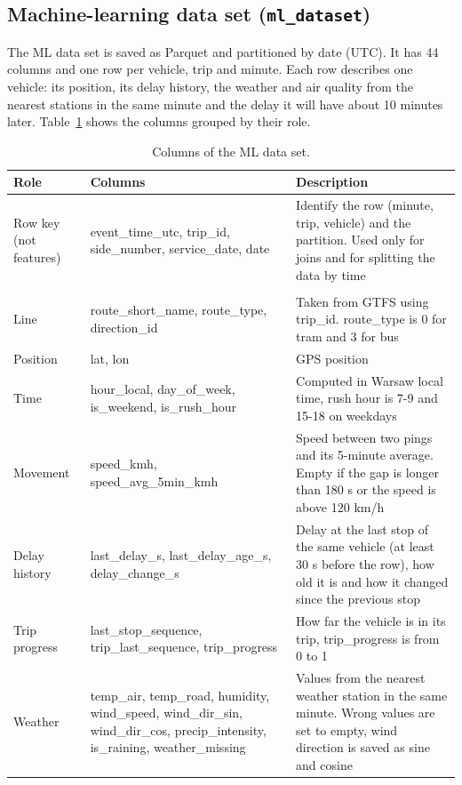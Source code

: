 \documentclass[11pt]{article}
\begin{document}
\subsection{Machine-learning data set (\texttt{ml\_dataset})}

The ML data set is saved as Parquet and partitioned by date (UTC). It has 44 columns and one row per vehicle, trip and minute.
Each row describes one vehicle: its position, its delay history, the weather and air quality from the nearest stations in the same minute
and the delay it will have about 10 minutes later. Table~\ref{tab:ml} shows the columns grouped by their role.

\begin{table}[H]
\centering
\small
\caption{Columns of the ML data set.}\label{tab:ml}
\begin{tabular}{|>{\raggedright\arraybackslash}p{2.4cm}|>{\raggedright\arraybackslash}p{4.4cm}|>{\raggedright\arraybackslash}p{6.6cm}|}
\hline
\textbf{Role} & \textbf{Columns} & \textbf{Description} \\
\hline
Row key (not features) & event\_time\_utc, trip\_id, side\_number, service\_date, date & Identify the row (minute, trip, vehicle) and the partition. Used only for joins and for splitting the data by time \\
\hline
\multicolumn{3}{|l|}{\textit{Independent features (30)}} \\
\hline
Line & route\_short\_name, route\_type, direction\_id & Taken from GTFS using trip\_id. route\_type is 0 for tram and 3 for bus \\
\hline
Position & lat, lon & GPS position \\
\hline
Time & hour\_local, day\_of\_week, is\_weekend, is\_rush\_hour & Computed in Warsaw local time, rush hour is 7-9 and 15-18 on weekdays \\
\hline
Movement & speed\_kmh, speed\_avg\_5min\_kmh & Speed between two pings and its 5-minute average. Empty if the gap is longer than 180 s or the speed is above 120 km/h \\
\hline
Delay history & last\_delay\_s, last\_delay\_age\_s, delay\_change\_s & Delay at the last stop of the same vehicle (at least 30 s before the row), how old it is and how it changed since the previous stop \\
\hline
Trip progress & last\_stop\_sequence, trip\_last\_sequence, trip\_progress & How far the vehicle is in its trip, trip\_progress is from 0 to 1 \\
\hline
Weather & temp\_air, temp\_road, humidity, wind\_speed, wind\_dir\_sin, wind\_dir\_cos, precip\_intensity, is\_raining, weather\_missing & Values from the nearest weather station in the same minute. Wrong values are set to empty, wind direction is saved as sine and cosine \\

\end{tabular}
\end{table}
\end{document}

